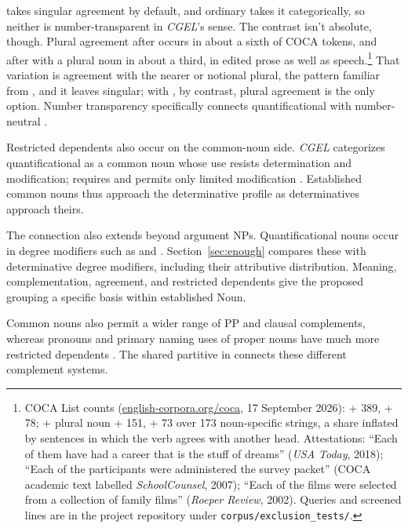 \documentclass[12pt]{article}
\begin{document}
 takes singular agreement by default, and ordinary  takes it categorically, so neither is number-transparent in \textit{CGEL}'s sense. The contrast isn't absolute, though. Plural agreement after  occurs in about a sixth of COCA tokens, and after  with a plural noun in about a third, in edited prose as well as speech.\footnote{COCA List counts (\href{https://www.english-corpora.org/coca/}{english-corpora.org/coca}, 17 September 2026):  +  389, +  78;  + plural noun +  151, +  73 over 173 noun-specific strings, a share inflated by sentences in which the verb agrees with another head. Attestations: \enquote{Each of them have had a career that is the stuff of dreams} (\textit{USA Today}, 2018); \enquote{Each of the participants were administered the survey packet} (COCA academic text labelled \textit{SchoolCounsel}, 2007); \enquote{Each of the films were selected from a collection of family films} (\textit{Roeper Review}, 2002). Queries and screened lines are in the project repository under \texttt{corpus/exclusion\_tests/}.} That variation is agreement with the nearer or notional plural, the pattern familiar from , and it leaves  singular; with , by contrast, plural agreement is the only option. Number transparency specifically connects quantificational  with number-neutral .

Restricted dependents also occur on the common-noun side. \textit{CGEL} categorizes quantificational  as a common noun whose use resists determination and modification;  requires  and permits only limited modification \citep[349--350]{huddleston2002}. Established common nouns thus approach the determinative profile as determinatives approach theirs.

The connection also extends beyond argument NPs. Quantificational nouns occur in degree modifiers such as  and  \citep[549--550]{huddleston2002}. Section~\ref{sec:enough} compares these with determinative degree modifiers, including their attributive distribution. Meaning, complementation, agreement, and restricted dependents give the proposed grouping a specific basis within established Noun.

Common nouns also permit a wider range of PP and clausal complements, whereas pronouns and primary naming uses of proper nouns have much more restricted dependents \citep[429--430, 439--443, 517--521]{huddleston2002}. The shared partitive in  connects these different complement systems.
\end{document}
